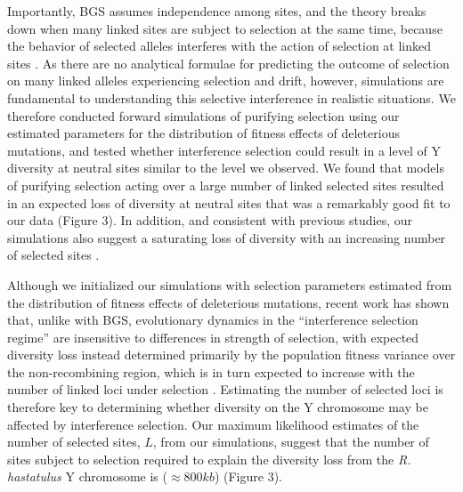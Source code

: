 \documentclass[9pt,twocolumn,twoside]{gsajnl}
\begin{document}
Importantly, BGS assumes independence among sites, and the theory breaks down when many linked sites are subject to selection at the same time, because the behavior of selected alleles interferes with the action of selection at linked sites \citep{good2014genetic,KaiserCharlesworth}. As there are no analytical formulae for predicting the outcome of selection on many linked alleles experiencing selection and drift, however, simulations are fundamental to understanding this selective interference in realistic situations. We therefore conducted forward simulations of purifying selection using our estimated parameters for the distribution of fitness effects of deleterious mutations, and tested whether interference selection could result in a level of Y diversity at neutral sites similar to the level we observed. We found that models of purifying selection acting over a large number of linked selected sites resulted in an expected loss of diversity at neutral sites that was a remarkably good fit to our data (Figure 3). In addition, and consistent with previous studies, our simulations also suggest a saturating loss of diversity with an increasing number of selected sites \citep{KaiserCharlesworth}.

Although we initialized our simulations with selection parameters estimated from the distribution of fitness effects of deleterious mutations, recent work has shown that, unlike with BGS, evolutionary dynamics in the “interference selection regime” are insensitive to differences in strength of selection, with expected diversity loss instead determined primarily by the population fitness variance over the non-recombining region, which is in turn expected to increase with the number of linked loci under selection \citep{good2014genetic}. Estimating the number of selected loci is therefore key to determining whether diversity on the Y chromosome may be affected by interference selection. Our maximum likelihood estimates of the number of selected sites, $L$, from our simulations, suggest that the number of sites subject to selection required to explain the diversity loss from the \textit{R. hastatulus} Y chromosome is ($\approx 800 kb$) (Figure 3).
\end{document}
